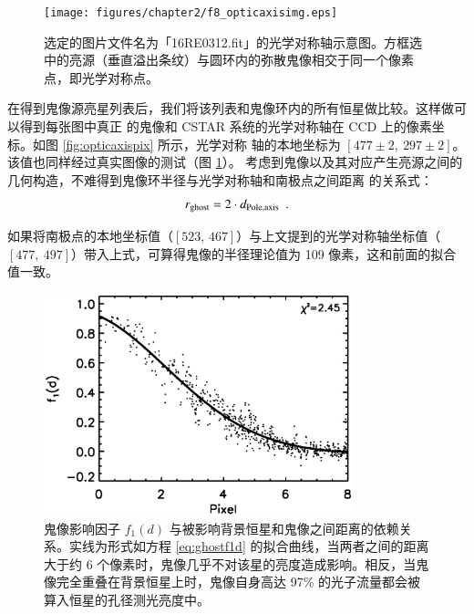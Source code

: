 \begin{figure}[t]
\centering
\texttt{[image: figures/chapter2/f8\_opticaxisimg.eps]}
\caption{选定的图片文件名为「16RE0312.fit」的光学对称轴示意图。方框选中的亮源（垂直溢出条纹）与圆环内的弥散鬼像相交于同一个像素点，即光学对称点。}
\label{fig:opticaxisimg}
\end{figure}

在得到鬼像源亮星列表后，我们将该列表和鬼像环内的所有恒星做比较。这样做可以得到每张图中真正
的鬼像和 CSTAR 系统的光学对称轴在 CCD 上的像素坐标。如图 \ref{fig:opticaxispix} 所示，光学对称
轴的本地坐标为 $[477\pm2,\ 297\pm2]$。该值也同样经过真实图像的测试（图 \ref{fig:opticaxisimg}）。
考虑到鬼像以及其对应产生亮源之间的几何构造，不难得到鬼像环半径与光学对称轴和南极点之间距离
的关系式：
\begin{equation} \label{eq:ghostgeometry}
r_{\mathrm{ghost}}=2\cdot d_{\mathrm{Pole, axis}} \ \ . 
\end{equation} %

如果将南极点的本地坐标值（$[523,\,467]$）与上文提到的光学对称轴坐标值（$[477,\ 497]$）带入上式，可算得鬼像的半径理论值为 109 像素，这和前面的拟合值一致。

\begin{figure}[ht!]
\centering
\includegraphics[width=0.8\textwidth, trim={0.5cm 0.3cm 0.5cm 0}]{figures/chapter2/f9_ghostfit.eps}
\caption{鬼像影响因子 $f_1(d)$ 与被影响背景恒星和鬼像之间距离的依赖关系。实线为形式如方程 \ref{eq:ghostf1d} 的拟合曲线，当两者之间的距离大于约 6 个像素时，鬼像几乎不对该星的亮度造成影响。相反，当鬼像完全重叠在背景恒星上时，鬼像自身高达 97\% 的光子流量都会被算入恒星的孔径测光亮度中。}
\label{fig:ghostfit}
\end{figure}

